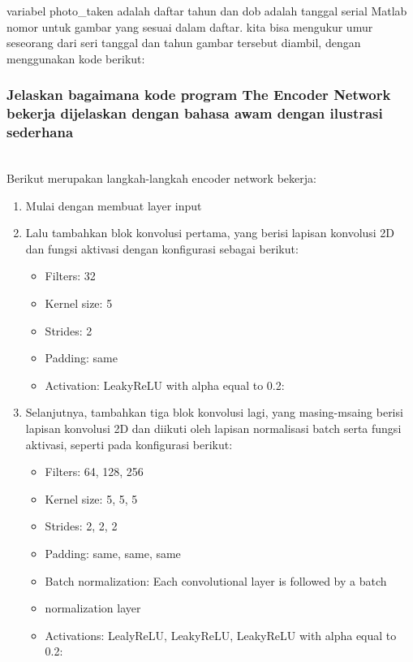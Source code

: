 variabel photo\_taken adalah daftar tahun dan dob adalah tanggal serial Matlab nomor untuk gambar yang sesuai dalam daftar. kita bisa mengukur umur seseorang dari seri tanggal dan tahun gambar tersebut diambil, dengan menggunakan kode berikut:


\subsubsection{Jelaskan bagaimana kode program The Encoder Network bekerja dijelaskan dengan bahasa awam dengan ilustrasi sederhana}
\hfill\\
Berikut merupakan langkah-langkah encoder network bekerja:
\begin{enumerate}
\item Mulai dengan membuat layer input


\item Lalu tambahkan blok konvolusi pertama, yang berisi lapisan konvolusi 2D dan fungsi aktivasi dengan konfigurasi sebagai berikut:
	\begin{itemize}
		\item Filters: 32
		\item Kernel size: 5
		\item Strides: 2
		\item Padding: same
		\item Activation: LeakyReLU with alpha equal to 0.2:
	\end{itemize}


\item Selanjutnya, tambahkan tiga blok konvolusi lagi, yang masing-msaing berisi lapisan konvolusi 2D dan diikuti oleh lapisan normalisasi batch serta fungsi aktivasi, seperti pada konfigurasi berikut:
	\begin{itemize}
		\item Filters: 64, 128, 256
		\item Kernel size: 5, 5, 5
		\item Strides: 2, 2, 2
		\item Padding: same, same, same
		\item Batch normalization: Each convolutional layer is followed by a batch
		\item normalization layer
		\item Activations: LealyReLU, LeakyReLU, LeakyReLU with alpha equal to 0.2:
	\end{itemize}



\end{enumerate}
